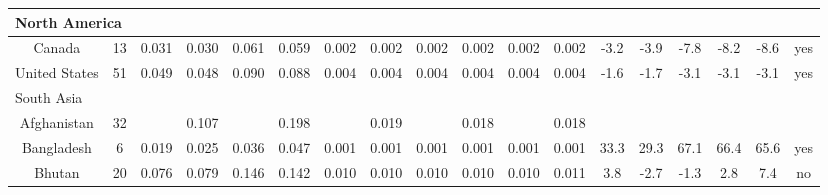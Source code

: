 \documentclass[10pt]{article}
\begin{document}
\begin{center}
\begin{tabular}{|c|c|c|c|c|c|c|c|c|c|c|c|c|c|c|c|c|c|}
\hline
\multicolumn{18}{|l|}{North America} \\
\hline
Canada & 13 & 0.031 & 0.030 & 0.061 & 0.059 & 0.002 & 0.002 & 0.002 & 0.002 & 0.002 & 0.002 & -3.2 & -3.9 & -7.8 & -8.2 & -8.6 & yes \\
\hline
United States & 51 & 0.049 & 0.048 & 0.090 & 0.088 & 0.004 & 0.004 & 0.004 & 0.004 & 0.004 & 0.004 & -1.6 & -1.7 & -3.1 & -3.1 & -3.1 & yes \\
\hline
\multicolumn{18}{|l|}{South Asia} \\
\hline
Afghanistan & 32 &  & 0.107 &  & 0.198 &  & 0.019 &  & 0.018 &  & 0.018 &  &  &  &  &  &  \\
\hline
Bangladesh & 6 & 0.019 & 0.025 & 0.036 & 0.047 & 0.001 & 0.001 & 0.001 & 0.001 & 0.001 & 0.001 & 33.3 & 29.3 & 67.1 & 66.4 & 65.6 & yes \\
\hline
Bhutan & 20 & 0.076 & 0.079 & 0.146 & 0.142 & 0.010 & 0.010 & 0.010 & 0.010 & 0.010 & 0.011 & 3.8 & -2.7 & -1.3 & 2.8 & 7.4 & no \\
\hline
\end{tabular}
\end{center}
\end{document}
